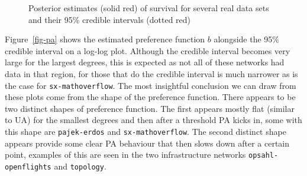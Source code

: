 \documentclass[
  sn-basic,
]{sn-jnl}
\theoremstyle{plain}
\theoremstyle{remark}
\begin{document}
\begin{figure}[H]


\caption{\label{fig-shapes}Posterior estimates (solid red) of survival
for several real data sets and their 95\% credible intervals (dotted
red)}

\end{figure}%

Figure~\ref{fig-pa} shows the estimated preference function \(b\)
alongside the 95\% credible interval on a log-log plot. Although the
credible interval becomes very large for the largest degrees, this is
expected as not all of these networks had data in that region, for those
that do the credible interval is much narrower as is the case for
\texttt{sx-mathoverflow}. The most insightful conclusion we can draw
from these plots come from the shape of the preference function. There
appears to be two distinct shapes of preference function. The first
appears mostly flat (similar to UA) for the smallest degrees and then
after a threshold PA kicks in, some with this shape are
\texttt{pajek-erdos} and \texttt{sx-mathoverflow}. The second distinct
shape appears provide some clear PA behaviour that then slows down after
a certain point, examples of this are seen in the two infrastructure
networks \texttt{opsahl-openflights} and \texttt{topology}.
\end{document}

